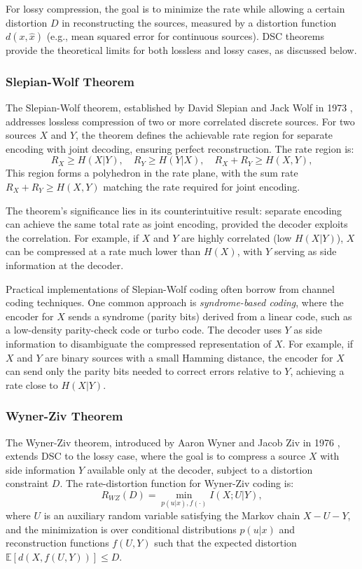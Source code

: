For lossy compression, the goal is to minimize the rate while allowing a certain distortion $D$ in reconstructing the sources, measured by a distortion function $d(x,\hat{x})$ (e.g., mean squared error for continuous sources). DSC theorems provide the theoretical limits for both lossless and lossy cases, as discussed below.

\subsubsection{Slepian-Wolf Theorem}

The Slepian-Wolf theorem, established by David Slepian and Jack Wolf in 1973 \cite{SlepianWolf1973}, addresses lossless compression of two or more correlated discrete sources. For two sources $X$ and $Y$, the theorem defines the achievable rate region for separate encoding with joint decoding, ensuring perfect reconstruction. The rate region is:
\begin{equation}
    R_X \geq H(X|Y), \quad R_Y \geq H(Y|X), \quad R_X + R_Y \geq H(X,Y),
\end{equation}
This region forms a polyhedron in the rate plane, with the sum rate $R_X + R_Y \geq H(X,Y)$ matching the rate required for joint encoding.

The theorem's significance lies in its counterintuitive result: separate encoding can achieve the same total rate as joint encoding, provided the decoder exploits the correlation. For example, if $X$ and $Y$ are highly correlated (low $H(X|Y)$), $X$ can be compressed at a rate much lower than $H(X)$, with $Y$ serving as side information at the decoder.

Practical implementations of Slepian-Wolf coding often borrow from channel coding techniques. One common approach is \emph{syndrome-based coding}, where the encoder for $X$ sends a syndrome (parity bits) derived from a linear code, such as a low-density parity-check code or turbo code. The decoder uses $Y$ as side information to disambiguate the compressed representation of $X$. For example, if $X$ and $Y$ are binary sources with a small Hamming distance, the encoder for $X$ can send only the parity bits needed to correct errors relative to $Y$, achieving a rate close to $H(X|Y)$.

\subsubsection{Wyner-Ziv Theorem}

The Wyner-Ziv theorem, introduced by Aaron Wyner and Jacob Ziv in 1976 \cite{1055508}, extends DSC to the lossy case, where the goal is to compress a source $X$ with side information $Y$ available only at the decoder, subject to a distortion constraint $D$. The rate-distortion function for Wyner-Ziv coding is:
\begin{equation}
    R_{WZ}(D) = \min_{p(u|x), f(\cdot)} I(X;U|Y),
\end{equation}
where $U$ is an auxiliary random variable satisfying the Markov chain $X - U - Y$, and the minimization is over conditional distributions $p(u|x)$ and reconstruction functions $f(U,Y)$ such that the expected distortion $\mathbb{E}[d(X, f(U,Y))] \leq D$.

